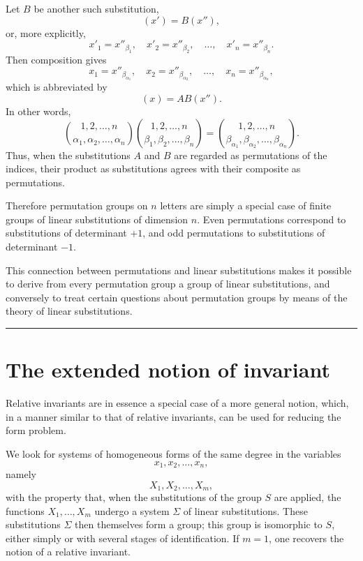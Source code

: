 \documentclass[11pt]{article}
\begin{document}
Let $B$ be another such substitution,
\begin{equation}\label{eq:weber8-perm-second}
(x')=B(x''),
\end{equation}
or, more explicitly,
\begin{equation}\label{eq:weber8-perm-second-coords}
x'_1=x''_{\beta_1},\quad x'_2=x''_{\beta_2},\quad\ldots,\quad x'_n=x''_{\beta_n}.
\end{equation}
Then composition gives
\begin{equation}\label{eq:weber8-perm-compose-coords}
x_1=x''_{\beta_{\alpha_1}},\quad x_2=x''_{\beta_{\alpha_2}},\quad\ldots,\quad x_n=x''_{\beta_{\alpha_n}},
\end{equation}
which is abbreviated by
\begin{equation}\label{eq:weber8-perm-compose}
(x)=AB(x'').
\end{equation}
In other words,
\begin{equation}\label{eq:weber8-perm-product}
\binom{1,2,\ldots,n}{\alpha_1,\alpha_2,\ldots,\alpha_n}
\binom{1,2,\ldots,n}{\beta_1,\beta_2,\ldots,\beta_n}
=
\binom{1,2,\ldots,n}{\beta_{\alpha_1},\beta_{\alpha_2},\ldots,\beta_{\alpha_n}}.
\end{equation}
Thus, when the substitutions $A$ and $B$ are regarded as permutations of the indices, their product as substitutions agrees with their composite as permutations.

Therefore permutation groups on $n$ letters are simply a special case of finite groups of linear substitutions of dimension $n$.  Even permutations correspond to substitutions of determinant $+1$, and odd permutations to substitutions of determinant $-1$.

This connection between permutations and linear substitutions makes it possible to derive from every permutation group a group of linear substitutions, and conversely to treat certain questions about permutation groups by means of the theory of linear substitutions.

\bigskip
\hrule
\bigskip

\section{The extended notion of invariant}

Relative invariants are in essence a special case of a more general notion, which, in a manner similar to that of relative invariants, can be used for reducing the form problem.

We look for systems of homogeneous forms of the same degree in the variables
\[
 x_1,x_2,\ldots,x_n,
\]
namely
\begin{equation}\label{eq:w9-X-system}
 X_1,X_2,\ldots,X_m,
\end{equation}
with the property that, when the substitutions of the group $S$ are applied, the functions $X_1,\ldots,X_m$ undergo a system $\Sigma$ of linear substitutions.  These substitutions $\Sigma$ then themselves form a group; this group is isomorphic to $S$, either simply or with several stages of identification.  If $m=1$, one recovers the notion of a relative invariant.
\end{document}
